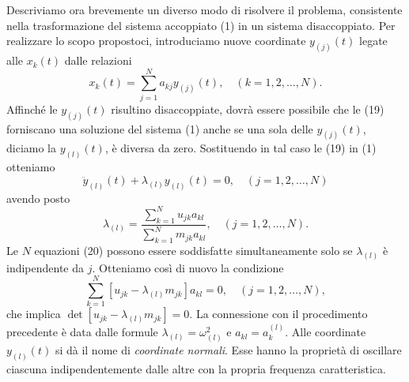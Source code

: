 \documentclass[11pt, a4paper]{book}
\numberwithin{equation}{section}
\begin{document}
Descriviamo ora brevemente un diverso modo di risolvere il problema, consistente nella trasformazione del sistema accoppiato (1) in un sistema disaccoppiato. Per realizzare lo scopo propostoci, introduciamo nuove coordinate $y_{(j)}(t)$ legate alle $x_k(t)$ dalle relazioni
\begin{equation}
x_k(t) = \sum_{j=1}^{N} a_{kj} y_{(j)}(t), \quad (k = 1, 2, \dots, N).
\end{equation}
Affinché le $y_{(j)}(t)$ risultino disaccoppiate, dovrà essere possibile che le (19) forniscano una soluzione del sistema (1) anche se una sola delle $y_{(j)}(t)$, diciamo la $y_{(l)}(t)$, è diversa da zero. Sostituendo in tal caso le (19) in (1) otteniamo
\begin{equation}
\ddot{y}_{(l)}(t) + \lambda_{(l)} y_{(l)}(t) = 0, \quad (j = 1, 2, \dots, N)
\end{equation}
avendo posto
\begin{equation}
\lambda_{(l)} = \frac{\sum_{k=1}^{N} u_{jk} a_{kl}}{\sum_{k=1}^{N} m_{jk} a_{kl}}, \quad (j = 1, 2, \dots, N).
\end{equation}
Le $N$ equazioni (20) possono essere soddisfatte simultaneamente solo se $\lambda_{(l)}$ è indipendente da $j$. Otteniamo così di nuovo la condizione
\begin{equation}
\sum_{k=1}^{N} [u_{jk} - \lambda_{(l)} m_{jk}] a_{kl} = 0, \quad (j = 1, 2, \dots, N),
\end{equation}
che implica $\det[u_{jk} - \lambda_{(l)} m_{jk}] = 0$. La connessione con il procedimento precedente è data dalle formule $\lambda_{(l)} = \omega_{(l)}^2$ e $a_{kl} = a_k^{(l)}$. Alle coordinate $y_{(l)}(t)$ si dà il nome di \textit{coordinate normali}. Esse hanno la proprietà di oscillare ciascuna indipendentemente dalle altre con la propria frequenza caratteristica.


\end{document}

